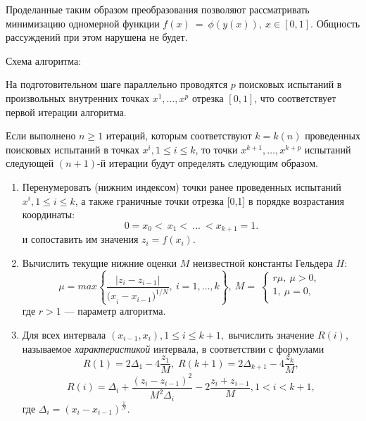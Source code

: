 \documentclass[12pt, a4paper, russian]{article}
\begin{document}
Проделанные таким образом преобразования позволяют рассматривать минимизацию одномерной функции $f(x)\ =\ \phi(y(x)), \ x\in [0,1]$. Общность рассуждений при этом нарушена не будет. 

Схема алгоритма:

На подготовительном шаге параллельно проводятся $p$ поисковых испытаний в произвольных внутренних точках $x^1, ...,x^p$ отрезка $[0,1]$, что соответствует первой итерации  алгоритма. 

Если выполнено $n\geq1$ итераций, которым соответствуют $k=k(n)$ проведенных поисковых испытаний в точках $x^i, 1\leq i\leq k$, то точки $x^{k+1},\ldots,x^{k+p}$ испытаний следующей $(n+1)$-й итерации будут определять следующим образом.

\begin{enumerate}

	\item  Перенумеровать (нижним индексом) точки ранее проведенных испытаний $x^i, 1\leq i\leq k$, а также граничные точки отрезка [0,1] в порядке возрастания координаты:
 \begin{displaymath}
		\label{agp1_sort}
	0=x_0<\ x_1<\ ...\ <x_{k+1}=1.
	\end{displaymath}
	и сопоставить им значения $z_i=f(x_i)$. 
	
	\item  Вычислить текущие нижние оценки $M$ неизвестной константы Гельдера $H$:
 \begin{displaymath}
		\label{agp2_mu}
	\mu=max\left\{\frac{|z_i-z_{i-1}|}{{{(x}_i-x_{i-1})}^{1/N}},\ i=1,\ldots,k\right\},\ M=\ \left\{\begin{matrix}r\mu,\ \mu>0,\\1,\ \mu=0,\\\end{matrix}\right.\
	\end{displaymath}
	где $r>1$ --- параметр алгоритма.
   
	\item  Для всех интервала $(x_{i-1},x_i), 1\leq i\leq k+1,$ вычислить значение $R(i)$, называемое \textit{характеристикой} интервала, в соответствии с формулами
	\begin{displaymath}
		\label{agp3_R1}
		R(1)=2\Delta_1-4\dfrac{z_1}{M}, \; R(k+1)=2\Delta_{k+1}-4\dfrac{z_k}{M},
	\end{displaymath}
	\begin{displaymath}
		\label{agp3_Ri}
		R(i)=\Delta_i+\dfrac{(z_i-z_{i-1})^2}{M^2\Delta_i}-2\dfrac{z_i+z_{i-1}}{M},1<i<k+1,
	\end{displaymath}
	где \(\Delta_i=(x_i-x_{i-1})^\frac{1}{N}\).
   

\end{enumerate}
\end{document}
